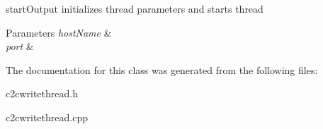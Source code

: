 start\-Output initializes thread parameters and starts thread 


\begin{DoxyParams}{Parameters}
{\em host\-Name} & \\
\hline
{\em port} & \\
\hline
\end{DoxyParams}


The documentation for this class was generated from the following files\-:\begin{DoxyCompactItemize}
\item 
c2cwritethread.\-h\item 
c2cwritethread.\-cpp\end{DoxyCompactItemize}

